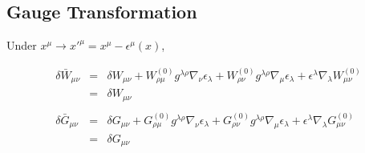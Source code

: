 \documentclass[10pt,letterpaper]{article}
\numberwithin{equation}{section}
\begin{document}
\subsection{Gauge Transformation}
Under $x^\mu \to x'^{\mu} = x^\mu -\epsilon^\mu(x)$,

\begin{eqnarray}
\delta \bar W_{\mu\nu} &=& \delta W_{\mu\nu} + W^{(0)}_{\rho\mu}g^{\lambda\rho} \nabla_\nu \epsilon_\lambda + W^{(0)}_{\rho\nu}g^{\lambda\rho} \nabla_\mu \epsilon_\lambda + \epsilon^\lambda\nabla_\lambda W^{(0)}_{\mu\nu} 
\nonumber\\
&=&\delta W_{\mu\nu}
\nonumber\\\nonumber\\
\delta \bar G_{\mu\nu} &=& \delta G_{\mu\nu} + G^{(0)}_{\rho\mu}g^{\lambda\rho} \nabla_\nu \epsilon_\lambda + G^{(0)}_{\rho\nu}g^{\lambda\rho} \nabla_\mu \epsilon_\lambda + \epsilon^\lambda\nabla_\lambda G^{(0)}_{\mu\nu} 
\nonumber\\
&=&\delta G_{\mu\nu}
\end{eqnarray}

%
%
\end{document}
